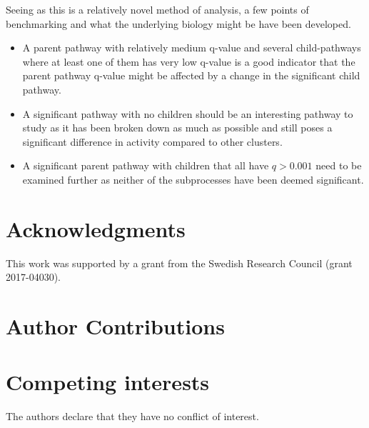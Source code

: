 \documentclass[11pt]{article}
\begin{document}
  Seeing as this is a relatively novel method of analysis, a few points of benchmarking and what the underlying biology might be have been developed.

  \begin{itemize}
      \item A parent pathway with relatively medium q-value and several child-pathways where at least one of them has very low q-value is a good indicator that the parent pathway q-value might be affected by a change in the significant child pathway.
      \item A significant pathway with no children should be an interesting pathway to study as it has been broken down as much as possible and still poses a significant difference in activity compared to other clusters.
      \item A significant parent pathway with children that all have $q > 0.001 $ need to be examined further as neither of the subprocesses have been deemed significant.
    \end{itemize}

\section*{Acknowledgments}

This work was supported by a grant from the Swedish Research Council (grant
2017-04030).

\section*{Author Contributions}

\section*{Competing interests}

The authors declare that they have no conflict of interest.
\end{document}
